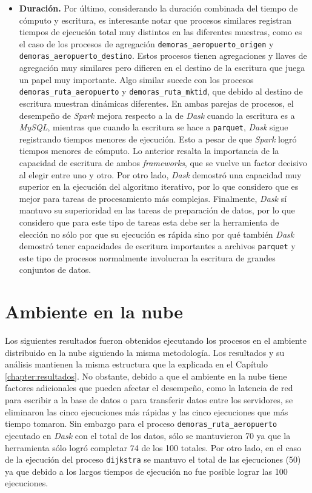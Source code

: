 \begin{itemize}
	\item \textbf{Duración.} Por último, considerando la duración combinada del tiempo de cómputo y escritura, es interesante notar que procesos similares registran tiempos de ejecución total muy distintos en las diferentes muestras, como es el caso de los procesos de agregación \texttt{demoras\_aeropuerto\_origen} y \texttt{demoras\_aeropuerto\_destino}. Estos procesos tienen agregaciones y llaves de agregación muy similares pero difieren en el destino de la escritura que juega un papel muy importante. Algo similar sucede con los procesos \texttt{demoras\_ruta\_aeropuerto} y \texttt{demoras\_ruta\_mktid}, que debido al destino de escritura muestran dinámicas diferentes. En ambas parejas de procesos, el desempeño de \textit{Spark} mejora respecto a la de \textit{Dask} cuando la escritura es a \textit{MySQL}, mientras que cuando la escritura se hace a \texttt{parquet}, \textit{Dask} sigue registrando tiempos menores de ejecución. Esto a pesar de que \textit{Spark} logró tiempos menores de cómputo. Lo anterior resalta la importancia de la capacidad de escritura de ambos \textit{frameworks}, que se vuelve un factor decisivo al elegir entre uno y otro. Por otro lado, \textit{Dask} demostró una capacidad muy superior en la ejecución del algoritmo iterativo, por lo que considero que es mejor para tareas de procesamiento más complejas. Finalmente, \textit{Dask} sí mantuvo su superioridad en las tareas de preparación de datos, por lo que considero que para este tipo de tareas esta debe ser la herramienta de elección no sólo por que su ejecución es rápida sino por qué también \textit{Dask} demostró tener capacidades de escritura importantes a archivos \texttt{parquet} y este tipo de procesos normalmente involucran la escritura de grandes conjuntos de datos. 
	
\end{itemize}


\newpage

\section{Ambiente en la nube}
\label{section:resultados-ambiente-nube}

Los siguientes resultados fueron obtenidos ejecutando los procesos en el ambiente distribuido en la nube siguiendo la misma metodología. Los resultados y su análisis mantienen la misma estructura que la explicada en el Capítulo \ref{chapter:resultados}. No obstante, debido a que el ambiente en la nube tiene factores adicionales que pueden afectar el desempeño, como la latencia de red para escribir a la base de datos o para transferir datos entre los servidores, se eliminaron las cinco ejecuciones más rápidas y las cinco ejecuciones que más tiempo tomaron. Sin embargo para el proceso \texttt{demoras\_ruta\_aeropuerto} ejecutado en \textit{Dask} con el total de los datos, sólo se mantuvieron 70 ya que la herramienta sólo logró completar 74 de los 100 totales. Por otro lado, en el caso de la ejecución del proceso \texttt{dijkstra} se mantuvo el total de las ejecuciones (50) ya que debido a los largos tiempos de ejecución no fue posible lograr las 100 ejecuciones. 

